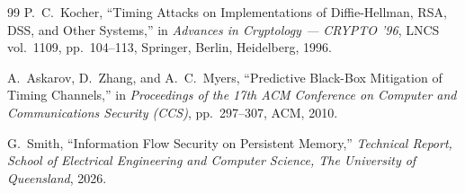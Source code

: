 \documentclass[a4paper,12pt]{report}
\begin{document}
\begin{thebibliography}{99}
P.~C.~Kocher,
\newblock ``Timing Attacks on Implementations of Diffie-Hellman, RSA, DSS, and Other Systems,''
\newblock in \emph{Advances in Cryptology --- CRYPTO '96}, LNCS vol.~1109, pp.~104--113, Springer, Berlin, Heidelberg, 1996.

A.~Askarov, D.~Zhang, and A.~C.~Myers,
\newblock ``Predictive Black-Box Mitigation of Timing Channels,''
\newblock in \emph{Proceedings of the 17th ACM Conference on Computer and Communications Security (CCS)}, pp.~297--307, ACM, 2010.

G.~Smith,
\newblock ``Information Flow Security on Persistent Memory,''
\newblock \emph{Technical Report, School of Electrical Engineering and Computer Science, The University of Queensland}, 2026.

\end{thebibliography}
\endgroup
\end{document}
